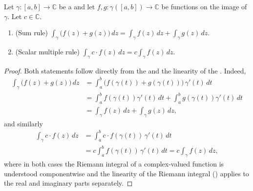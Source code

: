 \begin{proposition} \label{proposition:linearity_of_the_contour_integral}
Let $\gamma : [a,b] \to \mathbb{C}$ be a  and let $f, g : \gamma([a,b]) \to \mathbb{C}$ be  functions on the image of $\gamma$. Let $c \in \mathbb{C}$.

\begin{enumerate}
    \item (Sum rule) $\displaystyle\int_{\gamma} \bigl(f(z) + g(z)\bigr)\,dz = \int_{\gamma} f(z)\,dz + \int_{\gamma} g(z)\,dz.$
    \item (Scalar multiple rule) $\displaystyle\int_{\gamma} c \cdot f(z)\,dz = c \int_{\gamma} f(z)\,dz.$
\end{enumerate}
\end{proposition}

\begin{proof}
    Both statements follow directly from the  and the linearity of the . Indeed,
    \begin{align*}
        \int_{\gamma} \bigl(f(z) + g(z)\bigr)\,dz &= \int_a^b \bigl(f(\gamma(t)) + g(\gamma(t))\bigr)\,\gamma'(t)\,dt \\
        &= \int_a^b f(\gamma(t))\gamma'(t)\,dt + \int_a^b g(\gamma(t))\gamma'(t)\,dt \\
        &= \int_{\gamma} f(z)\,dz + \int_{\gamma} g(z)\,dz,
    \end{align*}
    and similarly
    \begin{align*}
        \int_{\gamma} c \cdot f(z)\,dz &= \int_a^b c \cdot f(\gamma(t))\,\gamma'(t)\,dt \\
        &= c \int_a^b f(\gamma(t))\,\gamma'(t)\,dt = c \int_{\gamma} f(z)\,dz,
    \end{align*}
    where in both cases the Riemann integral of a complex-valued function is understood componentwise and the linearity of the Riemann integral () applies to the real and imaginary parts separately.
\end{proof}